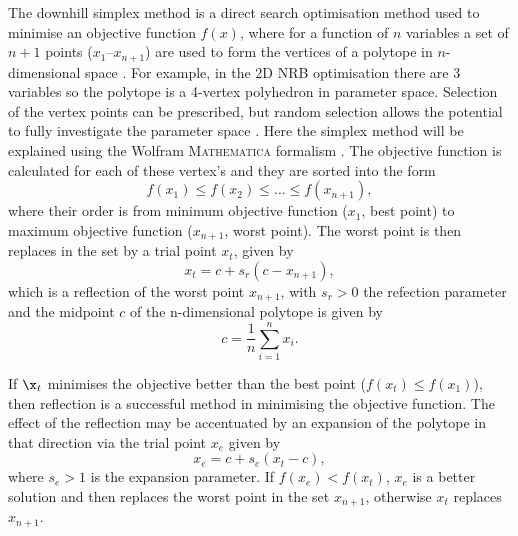 \documentclass[../main.tex]{subfiles}
\begin{document}
The downhill simplex method is a direct search optimisation method used to minimise an objective function $f\left(x\right)$, where for a function of $n$ variables a set of $n+1$ points ($x_{1}$--$x_{n+1}$) are used to form the vertices of a polytope in $n$-dimensional space \cite{wolfram2021nmaximize}. For example, in the 2D NRB optimisation there are 3 variables so the polytope is a 4-vertex polyhedron in parameter space. Selection of
the vertex points can be prescribed, but random selection allows the potential to fully investigate the parameter space \cite{koshel2002enhancement}. Here the simplex method will be explained using the Wolfram \textsc{Mathematica} formalism \cite{wolfram2021nmaximize}. The objective function is calculated for each of these vertex's and they are sorted into the form
\begin{equation}
f\left(x_{1}\right) \leq f\left(x_{2}\right) \leq \ldots \leq f\left(x_{n+1}\right),
\label{eq:simplex_polytope_objective_functions}
\end{equation}
where their order is from minimum objective function ($x_{1}$, best point) to maximum objective function ($x_{n+1}$, worst point). The worst point is then replaces in the set by a trial point $x_{t}$, given by
\begin{equation}
x_{t} = c+s_{r}\left(c-x_{n+1}\right),
\label{eq:simplex_trial_point}    
\end{equation}
which is a reflection of the worst point $x_{n+1}$, with $s_{r} > 0$ the refection parameter and the midpoint $c$ of the n-dimensional polytope is given by
\begin{equation}
c = \frac{1}{n}\sum_{i=1}^{n}x_{i}.
\label{eq:polytope_centroid_simplex}
\end{equation}

If $\x_{t}$ minimises the objective better than the best point ($f\left(x_{t}\right) \leq f\left(x_{1}\right)$), then reflection is a successful method in minimising the objective function. The effect of the reflection may be accentuated by an expansion of the polytope in that direction via the trial point $x_{e}$ given by
\begin{equation}
x_{e} = c+s_{e}\left(x_{t}-c\right),
\label{eq:simplex_expansion}    
\end{equation}
where $s_{e} > 1$ is the expansion parameter. If $f\left(x_{e}\right) < f\left(x_{t}\right)$, $x_{e}$ is a better solution and then replaces the worst point in the set $x_{n+1}$, otherwise $x_{t}$ replaces $x_{n+1}$. 
\end{document}
